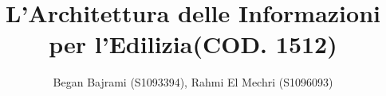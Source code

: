 \documentclass{elegantbook}
\title{\huge\textbf{L'Architettura delle Informazioni per l'Edilizia(COD. 1512)}}
\author{\large Began Bajrami (S1093394), Rahmi El Mechri (S1096093)}
\begin{document}
        \large
	\maketitle
	\tableofcontents
	\renewcommand{\chaptername}{}
	\renewcommand{\thesection}{\arabic{section}}
	\renewcommand{\thesubsection}{}
	\renewcommand{\thesubsubsection}{}
	\titleformat{\paragraph}{\normalfont\large\bfseries}{}{1em}{}
        
        \newcommand\fattureMedieMensili{\the\numexpr \volumeFattura/120 \relax}
        \newcommand\frequenzaOpAdd{63}
        \newcommand\frequenzaOpConNove{20}
        \newcommand\frequenzaOpConUnoCinque{10}
        \newcommand\frequenzaOpConDueDue{2}
        \newcommand\frequenzaOpConDueNove{50}
        \newcommand\frequenzaOpConTrenta{5}
        \newcommand\frequenzaOpConTreUno{4}
        \newcommand\frequenzaOpSpeDue{4}

        \newcommand\volumeEsatto[1]{\color{darkgray}\textbf{#1}\color{black}}
        \newcommand\volumeCalcolato[1]{\color{gray}{#1}\color{black}}
        \newcommand\volumeLavoro{1500}
        \newcommand\volumeCollaboratore{110}
        \newcommand\volumeTecnico{16}
        \newcommand\volumeAttestato{5}
        \newcommand\volumeStruttura{1300}
        \newcommand\volumeCliente{1100}
        \newcommand\volumeAbilitazione{\volumeAttestato}

        \newcommand\volumeAvvocato{\the\numexpr(\volumeConsulenza/100)*90\relax} %

        \newcommand\percLavoro{\the\numexpr\volumeLavoro/100\relax}
        \newcommand\volumeProgetto{\the\numexpr\percLavoro*75\relax} 
        \newcommand\volumeCertificato{\the\numexpr\percLavoro*15\relax}
        \newcommand\volumeConsulenza{\the\numexpr\percLavoro*7\relax}
        \newcommand\volumePerizia{\the\numexpr\percLavoro*3\relax} 

        \newcommand\volumeFile{\the\numexpr\volumeLavoro * 250\relax} %

        \newcommand\percCliente{\the\numexpr\volumeCliente/100\relax}
        \newcommand\volumeCondominio{\the\numexpr\percCliente*5\relax}
        \newcommand\volumePersona{\the\numexpr\percCliente*87\relax}
        \newcommand\volumeImpresa{\the\numexpr\percCliente*7\relax}
\end{document}
